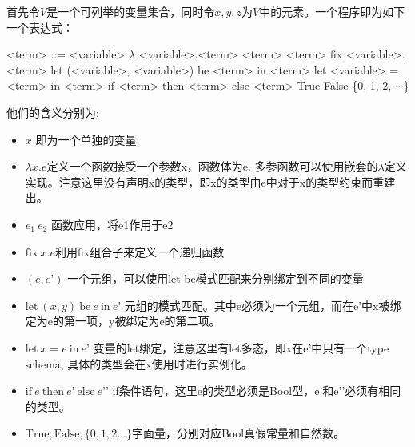 \documentclass[UTF8, colorlinks]{pkuthss}
\begin{document}
	首先令$V$是一个可列举的变量集合，同时令$x, y, z$为$V$中的元素。一个程序即为如下一个表达式：
	\setlength{\grammarindent}{8em} %
    \begin{grammar}
        <term> ::= <variable>
        \vspace{0.3em}
        \alt $\lambda$ <variable>.<term>
        \vspace{0.3em}
        \alt <term> <term>
        \vspace{0.3em}
        \alt fix <variable>.<term>
        \vspace{0.3em}
        \alt let (<variable>, <variable>) be <term> in <term>
        \vspace{0.3em}
        \alt let <variable> = <term> in <term>
        \vspace{0.3em}
        \alt if <term> then <term> else <term>
        \vspace{0.3em}
        \alt True
        \vspace{0.3em}
        \alt False
        \vspace{0.3em}
        \alt\{0, 1, 2, $\cdots$\}
	\end{grammar}
	他们的含义分别为:
	\begin{itemize}
	  \setlength\itemsep{0.1em}
		\item $x$ 即为一个单独的变量
		\item $\lambda x.e$定义一个函数接受一个参数x，函数体为e. 多参函数可以使用嵌套的$\lambda$定义实现。注意这里没有声明x的类型，即x的类型由e中对于x的类型约束而重建出。
		\item $e_1\ e_2$ 函数应用，将e1作用于e2
		\item $\mathrm{fix}\ x.e$利用fix组合子来定义一个递归函数
		\item $(e, e’)$ 一个元组，可以使用let be模式匹配来分别绑定到不同的变量
		\item $\mathrm{let}\ (x, y)\ \mathrm{be}\ e\ \mathrm{in}\ e’$ 元组的模式匹配。其中e必须为一个元组，而在e’中x被绑定为e的第一项，y被绑定为e的第二项。
		\item $\mathrm{let}\ x = e\ \mathrm{in}\ e’$ 变量的let绑定，注意这里有let多态，即x在e’中只有一个type schema, 具体的类型会在x使用时进行实例化。
		\item $\mathrm{if}\ e\ \mathrm{then}\ e’\ \mathrm{else}\ e’’$ if条件语句，这里e的类型必须是Bool型，e’和e’’必须有相同的类型。
		\item $\mathrm{True}, \mathrm{False}, \{0, 1, 2…\}$字面量，分别对应Bool真假常量和自然数。
	\end{itemize}	
\end{document}
